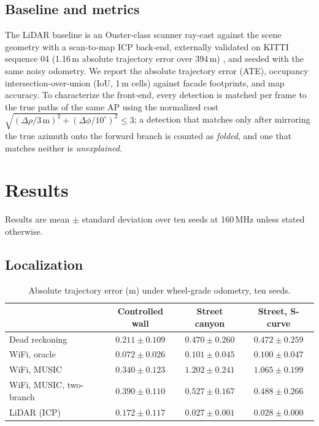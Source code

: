 \documentclass[preprint,12pt]{elsarticle}
\begin{document}
\subsection{Baseline and metrics}
The LiDAR baseline is an Ouster-class scanner ray-cast against the scene geometry with a
scan-to-map ICP back-end, externally validated on KITTI sequence 04 (1.16\,m absolute trajectory
error over 394\,m) \cite{geiger2012kitti}, and seeded with the same noisy odometry. We report the
absolute trajectory error (ATE), occupancy intersection-over-union (IoU, 1\,m cells) against
facade footprints, and map accuracy. To characterize the front-end, every detection is matched
per frame to the true paths of the same AP using the normalized cost
$\sqrt{(\Delta\rho/3\,\mathrm{m})^2+(\Delta\phi/10^\circ)^2}\le3$; a detection that matches only
after mirroring the true azimuth onto the forward branch is counted as \emph{folded}, and one
that matches neither is \emph{unexplained}.

\section{Results}\label{sec:results}

Results are mean $\pm$ standard deviation over ten seeds at 160\,MHz unless stated otherwise.

\subsection{Localization}\label{sec:loc}

\begin{table}[t]\centering\small
\caption{Absolute trajectory error (m) under wheel-grade odometry, ten seeds.}
\label{tab:ate}
\begin{tabular}{@{}lccc@{}}
\toprule
 & Controlled wall & Street canyon & Street, S-curve \\ \midrule
Dead reckoning              & $0.211\pm0.109$ & $0.470\pm0.260$ & $0.472\pm0.259$ \\
WiFi, oracle                & $\mathbf{0.072\pm0.026}$ & $0.101\pm0.045$ & $0.100\pm0.047$ \\
WiFi, MUSIC                 & $0.340\pm0.123$ & $1.202\pm0.241$ & $1.065\pm0.199$ \\
WiFi, MUSIC, two-branch     & $0.390\pm0.110$ & $0.527\pm0.167$ & $0.488\pm0.266$ \\
LiDAR (ICP)                 & $0.172\pm0.117$ & $\mathbf{0.027\pm0.001}$ & $\mathbf{0.028\pm0.000}$ \\
\bottomrule
\end{tabular}
\end{table}
\end{document}
